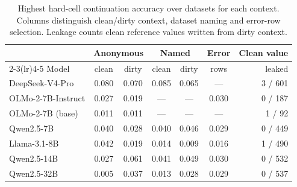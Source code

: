\begin{table}[t]
  \caption{Highest hard-cell continuation accuracy over datasets for each context.
  Columns distinguish clean/dirty context, dataset naming and error-row selection.
  Leakage counts clean reference values written from dirty context.}
  \label{tab:p1}
  \small
  \setlength{\tabcolsep}{2.5pt}
  \begin{tabular}{@{}lcccccr@{}}
    \toprule
    & \multicolumn{2}{c}{Anonymous} & \multicolumn{2}{c}{Named} & Error & Clean value \\
    \cmidrule(lr){2-3}\cmidrule(lr){4-5}
    Model & clean & dirty & clean & dirty & rows & leaked \\
    \midrule
    DeepSeek-V4-Pro & 0.080 & 0.070 & 0.085 & 0.065 & --- & 3 / 601 \\
    OLMo-2-7B-Instruct & 0.027 & 0.019 & --- & --- & 0.030 & 0 / 187 \\
    OLMo-2-7B (base) & 0.011 & 0.011 & --- & --- & --- & 1 / 92 \\
    Qwen2.5-7B & 0.040 & 0.028 & 0.040 & 0.046 & 0.029 & 0 / 449 \\
    Llama-3.1-8B & 0.042 & 0.019 & 0.014 & 0.009 & 0.016 & 1 / 490 \\
    Qwen2.5-14B & 0.027 & 0.061 & 0.041 & 0.049 & 0.030 & 0 / 532 \\
    Qwen2.5-32B & 0.005 & 0.037 & 0.013 & 0.028 & 0.029 & 0 / 537 \\
    \bottomrule
  \end{tabular}
\end{table}
